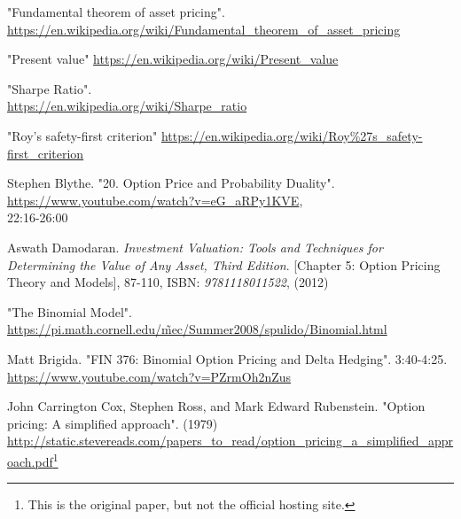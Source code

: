 \documentclass[12pt, letterpaper]{article}\usepackage{float}
\begin{document}
\begin{thebibliography}{9}
    "Fundamental theorem of asset pricing". \\
    \href{https://en.wikipedia.org/wiki/Fundamental\_theorem\_of\_asset\_pricing}{https://en.wikipedia.org/wiki/Fundamental\_theorem\_of\_asset\_pricing}

    "Present value"
    \href{https://en.wikipedia.org/wiki/Present\_value}{https://en.wikipedia.org/wiki/Present\_value}

    "Sharpe Ratio". \\
    \href{https://en.wikipedia.org/wiki/Sharpe\_ratio}{https://en.wikipedia.org/wiki/Sharpe\_ratio}

    "Roy's safety-first criterion"
    \href{https://en.wikipedia.org/wiki/Roy\%27s\_safety-first\_criterion}{https://en.wikipedia.org/wiki/Roy\%27s\_safety-first\_criterion}

    Stephen Blythe.
    "20. Option Price and Probability Duality". \\
    \href{https://www.youtube.com/watch?v=eG\_aRPy1KVE}{https://www.youtube.com/watch?v=eG\_aRPy1KVE}, \\
    22:16-26:00
  
    Aswath Damodaran.
    \textit{Investment Valuation: Tools and Techniques for Determining the Value of Any Asset, Third Edition}.
    [Chapter 5: Option Pricing Theory and Models], 87-110,
    ISBN: \textit{9781118011522},
    (2012)

    "The Binomial Model". \\
    \href{https://pi.math.cornell.edu/\~mec/Summer2008/spulido/Binomial.html}{https://pi.math.cornell.edu/\~mec/Summer2008/spulido/Binomial.html}

    Matt Brigida.
    "FIN 376: Binomial Option Pricing and Delta Hedging".
    3:40-4:25. \\
    \href{https://www.youtube.com/watch?v=PZrmOh2nZus}{https://www.youtube.com/watch?v=PZrmOh2nZus}

    John Carrington Cox, Stephen Ross, and Mark Edward Rubenstein.
    "Option pricing: A simplified approach".
    (1979)
    \href{http://static.stevereads.com/papers\_to\_read/option\_pricing\_a\_simplified\_approach.pdf}{http://static.stevereads.com/papers\_to\_read/option\_pricing\_a\_simplified\_approach.pdf}\footnote{This is the original paper, but not the official hosting site.}


\end{thebibliography}
\end{document}
